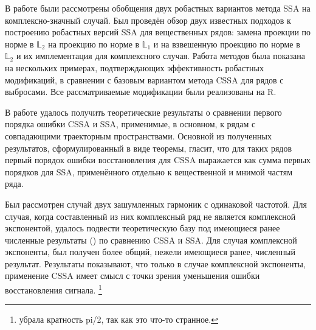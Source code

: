 \documentclass[specialist,
               substylefile = spbu.rtx,
               subf,href,colorlinks=true, 12pt]{disser}
\begin{document}


\conclusion
В работе были рассмотрены обобщения двух робастных вариантов метода SSA на комплексно-значный случай.
Был проведён обзор двух известных подходов к построению робастных версий SSA для вещественных рядов: замена проекции по норме в $\mathbb{L}_2$ на проекцию по норме в $\mathbb{L}_1$ и на взвешенную проекцию по норме в $\mathbb{L}_2$ и их имплементация для комплексного случая.
Работа методов была показана на нескольких примерах, подтверждающих эффективность робастных модификаций, в сравнении с базовым вариантом метода CSSA для рядов с выбросами. Все рассматриваемые модификации были реализованы на R.

В работе удалось получить теоретические результаты о сравнении первого порядка ошибки CSSA и SSA, применимые, в основном, к рядам с совпадающими траекторным пространствами. Основной из полученных результатов, сформулированный в виде теоремы, гласит, что для таких рядов первый порядок ошибки восстановления для CSSA выражается как сумма первых порядков для SSA, применённого отдельно к вещественной и мнимой частям ряда.

Был рассмотрен случай двух зашумленных гармоник с одинаковой частотой. Для случая, когда составленный из них комплексный ряд не является комплексной экспонентой, удалось подвести теоретическую базу под имеющиеся ранее численные результаты (\cite{Golyandina.etal2013}) по сравнению CSSA и SSA. Для случая комплексной экспоненты, был получен более общий, нежели имеющиеся ранее, численный результат.
Результаты показывают, что только в случае комплексной экспоненты, применение CSSA имеет смысл с точки зрения уменьшения ошибки восстановления сигнала.
\footnote{убрала кратность pi/2, так как это что-то странное.}
\end{document}

